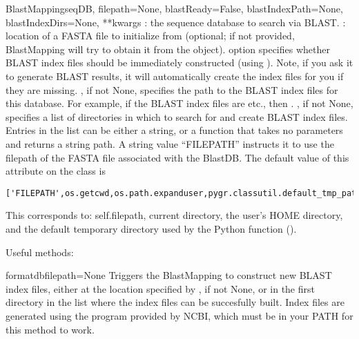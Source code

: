 \documentclass{howto}
\begin{document}
\begin{funcdesc}{BlastMapping}{seqDB, filepath=None,
                 blastReady=False, blastIndexPath=None, blastIndexDirs=None,
                 **kwargs}
  : the sequence database to search via BLAST.
  : location of a FASTA file to initialize from (optional;
  if not provided, BlastMapping will try to obtain it from the
   object).
   option specifies whether BLAST index files should
  be immediately
  constructed (using ).  Note, if you ask it to generate
  BLAST results, it will automatically create the index files for you
  if they are missing.
  , if not None, specifies the path to the BLAST index
  files for this database.  For example, if the BLAST index files are
   etc., then .
  , if not None, specifies a list of directories in which
  to search for and create BLAST index files.  Entries in the list can be
  either a string, or a function that takes no parameters and returns 
  a string path.  A string value ``FILEPATH'' instructs it to use the 
  filepath of the FASTA file associated with the BlastDB.
  The default value of this attribute on the  class is 
\begin{verbatim}
['FILEPATH',os.getcwd,os.path.expanduser,pygr.classutil.default_tmp_path]
\end{verbatim}
This corresponds to: self.filepath, current directory, the user's HOME
directory, and the default temporary directory used by the Python 
function ().
\end{funcdesc}

Useful methods:
\begin{funcdesc}{formatdb}{filepath=None}
  Triggers the BlastMapping to construct new BLAST index files, either at the
  location specified by , if not None, or in the first
  directory in the  list where the index files
  can be succesfully built.  Index files are generated using the 
   program provided by NCBI, which must be in your
  PATH for this method to work.
\end{funcdesc}
\end{document}
